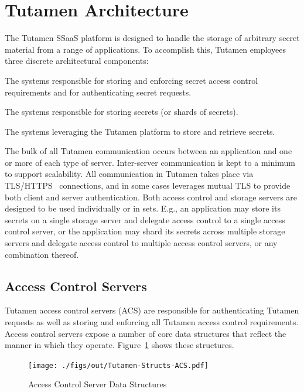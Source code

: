 \section{Tutamen Architecture}
\label{chap:tutamen:arch}

The Tutamen SSaaS platform is designed to handle the storage of
arbitrary secret material from a range of applications. To accomplish
this, Tutamen employees three discrete architectural components:

\begin{packed_desc}
\item[Access Control Servers (ACS):] The systems responsible for
  storing and enforcing secret access control requirements and for
  authenticating secret requests.
\item[Storage Servers (SS):] The systems responsible for storing
  secrets (or shards of secrets).
\item[Applications:] The systems leveraging the Tutamen platform to
  store and retrieve secrets.
\end{packed_desc}

The bulk of all Tutamen communication occurs between an application
and one or more of each type of server. Inter-server communication is
kept to a minimum to support scalability. All communication in Tutamen
takes place via TLS/HTTPS~\cite{dierks2008} connections, and in some
cases leverages mutual TLS to provide both client and server
authentication. Both access control and storage servers are designed
to be used individually or in sets. E.g., an application may store its
secrets on a single storage server and delegate access control to a
single access control server, or the application may shard its secrets
across multiple storage servers and delegate access control to
multiple access control servers, or any combination thereof.

\subsection{Access Control Servers}
\label{chap:tutamen:arch:acs}

Tutamen access control servers (ACS) are responsible for
authenticating Tutamen requests as well as storing and enforcing all
Tutamen access control requirements. Access control servers expose a
number of core data structures that reflect the manner in which they
operate. Figure~\ref{fig:tutamen:acstructs} shows these structures.

\begin{figure}[t]
  \centering
  \texttt{[image: ./figs/out/Tutamen-Structs-ACS.pdf]}
  \caption{Access Control Server Data Structures}
  \label{fig:tutamen:acstructs}
\end{figure}

